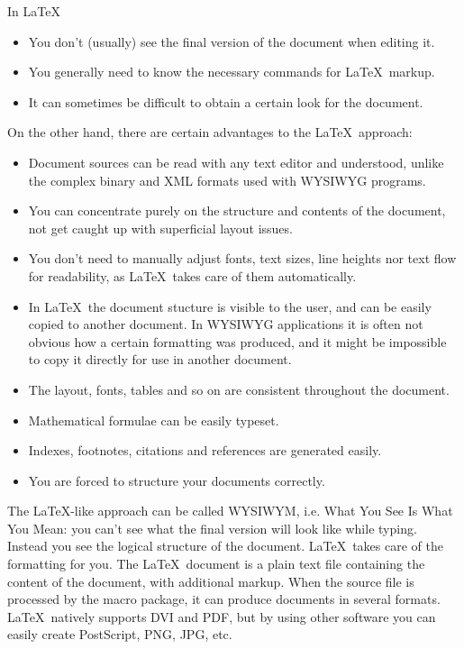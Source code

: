 In \LaTeX\:
\begin{itemize}
\item You don't (usually) see the final version of the document when editing it.
\item You generally need to know the necessary commands for \LaTeX\ markup.
\item It can sometimes be difficult to obtain a certain look for the document.
\end{itemize}
On the other hand, there are certain advantages to the \LaTeX\ approach:
\begin{itemize}
\item Document sources can be read with any text editor and understood, unlike the complex binary and XML formats used with WYSIWYG programs.
\item You can concentrate purely on the structure and contents of the document, not get caught up with superficial layout issues.
\item You don't need to manually adjust fonts, text sizes, line heights nor text flow for readability, as \LaTeX\ takes care of them automatically.
\item In \LaTeX\ the document stucture is visible to the user, and can be easily copied to another document. In WYSIWYG applications it is often not obvious how a certain formatting was produced, and it might be impossible to copy it directly for use in another document.
\item The layout, fonts, tables and so on are consistent throughout the document.
\item Mathematical formulae can be easily typeset.
\item Indexes, footnotes, citations and references are generated easily.
\item You are forced to structure your documents correctly.
\end{itemize}
The \LaTeX-like approach can be called WYSIWYM, i.e. What You See Is What You Mean: you can't see what the final version will look like while typing. Instead you see the logical structure of the document. \LaTeX\ takes care of the formatting for you.
The \LaTeX\ document is a plain text file containing the content of the document, with additional markup. When the source file is processed by the macro package, it can produce documents in several formats. \LaTeX\ natively supports DVI and PDF, but by using other software you can easily create PostScript, PNG, JPG, etc.



